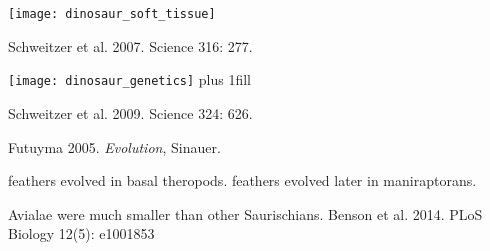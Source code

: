 {
\begin{frame}[b,plain]
\end{frame}
}

{
\begin{frame}[b,plain]
\begin{center}
	\texttt{[image: dinosaur\_soft\_tissue]}
\end{center}
\vfill
\tiny\hfill Schweitzer et al. 2007. Science 316: 277.
\end{frame}
}

{
\begin{frame}[b,plain]
	\hspace{-1em}\texttt{[image: dinosaur\_genetics]}
\vskip0pt plus 1fill

\tiny\hfill Schweitzer et al. 2009. Science 324: 626.
\end{frame}
}

{
\begin{frame}[b,plain]
\tiny Futuyma 2005. \textit{Evolution}, Sinauer.
\end{frame}
}

{
\begin{frame}[b,plain]{ feathers evolved in basal theropods.  feathers evolved later in maniraptorans.}

\end{frame}
}

{
\begin{frame}[b,plain]
\end{frame}
}



{
\begin{frame}[b,plain]{Avialae were much smaller than other Saurischians.}
	\tiny Benson et al. 2014. PLoS Biology 12(5): e1001853
\end{frame}
}


